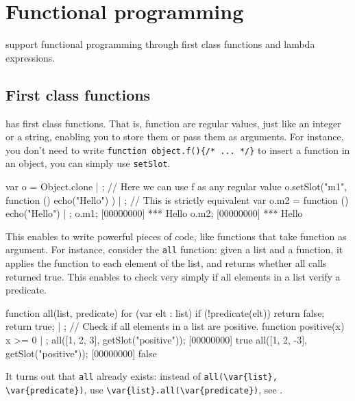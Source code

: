 
\chapter{Functional programming}
\label{sec:tut:functional}

\us support functional programming through first class functions and
lambda expressions.

\section{First class functions}

\us has first class functions. That is, function are regular values,
just like an integer or a string, enabling you to store them or pass
them as arguments. For instance, you don't need to write
\lstinline|function object.f(){/* ... */}| to insert a function in an
object, you can simply use \lstinline{setSlot}.

\begin{urbiscript}
var o = Object.clone | {};
// Here we can use f as any regular value
o.setSlot("m1", function () { echo("Hello") }) | {};
// This is strictly equivalent
var o.m2 = function () { echo("Hello") } | {};
o.m1;
[00000000] *** Hello
o.m2;
[00000000] *** Hello
\end{urbiscript}

This enables to write powerful pieces of code, like functions that
take function as argument. For instance, consider the \lstinline{all}
function: given a list and a function, it applies the function to each
element of the list, and returns whether all calls returned true. This
enables to check very simply if all elements in a list verify a
predicate.

\begin{urbiscript}
function all(list, predicate)
{
  for (var elt : list)
    if (!predicate(elt))
      return false;
  return true;
} | {};
// Check if all elements in a list are positive.
function positive(x) { x >= 0 } | {};
all([1, 2, 3], getSlot("positive"));
[00000000] true
all([1, 2, -3], getSlot("positive"));
[00000000] false
\end{urbiscript}

It turns out that \lstinline|all| already exists: instead of
\lstinline|all(\var{list}, \var{predicate})|, use
\lstinline|\var{list}.all(\var{predicate})|, see .

